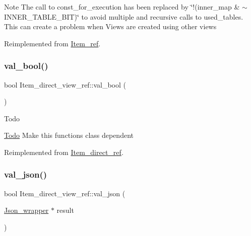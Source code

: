 \begin{DoxyNote}{Note}
The call to const\+\_\+for\+\_\+execution has been replaced by \char`\"{}!(inner\+\_\+map \& $\sim$\+I\+N\+N\+E\+R\+\_\+\+T\+A\+B\+L\+E\+\_\+\+B\+I\+T)\char`\"{} to avoid multiple and recursive calls to used\+\_\+tables. This can create a problem when Views are created using other views 
\end{DoxyNote}


Reimplemented from \mbox{\hyperlink{classItem__ref}{Item\+\_\+ref}}.

\mbox{\label{classItem__direct__view__ref_addadee858f933ad08e2bb3bb533067f3}} 
\subsubsection{\texorpdfstring{val\+\_\+bool()}{val\_bool()}}
{\footnotesize\ttfamily bool Item\+\_\+direct\+\_\+view\+\_\+ref\+::val\+\_\+bool (\begin{DoxyParamCaption}{ }\end{DoxyParamCaption})\hspace{0.3cm}{\ttfamily [virtual]}}

\begin{DoxyRefDesc}{Todo}
\item[\mbox{\hyperlink{todo__todo000026}{Todo}}]Make this functions class dependent \end{DoxyRefDesc}


Reimplemented from \mbox{\hyperlink{classItem__direct__ref_ae552bb7da0a5629c75850d6d0e07d344}{Item\+\_\+direct\+\_\+ref}}.

\mbox{\label{classItem__direct__view__ref_a4b28cab9b54ffdfe277bd2c26cb50709}} 
\subsubsection{\texorpdfstring{val\+\_\+json()}{val\_json()}}
{\footnotesize\ttfamily bool Item\+\_\+direct\+\_\+view\+\_\+ref\+::val\+\_\+json (\begin{DoxyParamCaption}\item[{\mbox{\hyperlink{classJson__wrapper}{Json\+\_\+wrapper}} $\ast$}]{result }\end{DoxyParamCaption})\hspace{0.3cm}{\ttfamily [virtual]}}

